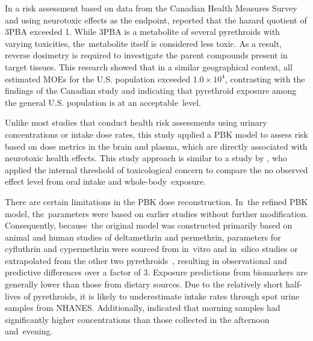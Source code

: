 \documentclass[toxics,article,accept,pdftex,moreauthors]{Definitions/mdpi}
\begin{document}
In a risk assessment based on data from the Canadian Health Measures
Survey and using neurotoxic effects as the endpoint,
\citet{faure_evaluation_2020} reported that the hazard quotient of 3PBA
exceeded 1. While 3PBA is a metabolite of several pyrethroids
with varying toxicities, the~metabolite itself is considered less toxic.
As a result, reverse dosimetry is required to investigate the parent
compounds present in target tissues. This research showed that in a
similar geographical context, all estimated MOEs for the U.S. population
exceeded \(1.0 \times 10^{4}\), contrasting with the findings of the
Canadian study and indicating that pyrethroid exposure among the general
U.S. population is at an acceptable~level.

Unlike most studies that conduct health risk assessments using urinary
concentrations or intake dose rates, this study applied a PBK model to assess
risk based on dose metrics in the brain and plasma, which are directly
associated with neurotoxic health effects. This study approach is similar to a
study by \citet{arnot_developing_2022}, who applied the internal threshold of
toxicological concern to compare the no observed effect level from oral intake
and whole-body~exposure.

There are certain limitations in the PBK dose reconstruction. In~the
refined PBK model, the~parameters were based on earlier studies without
further modification. Consequently, because~the original model was
constructed primarily based on animal and human studies of deltamethrin
and permethrin, parameters for cyfluthrin and cypermethrin were sourced
from in~vitro and in~silico studies or extrapolated from the other two
pyrethroids~\citep{quindroit2019estimating}, resulting in observational
and predictive differences over a factor of 3. Exposure predictions from
biomarkers are generally lower than those from dietary sources. Due to
the relatively short half-lives of pyrethroids, it is likely to
underestimate intake rates through spot urine samples from NHANES.
Additionally, \citet{barr2010urinary} indicated that morning samples had
significantly higher concentrations than those collected in the
afternoon and~evening. 
\end{document}
